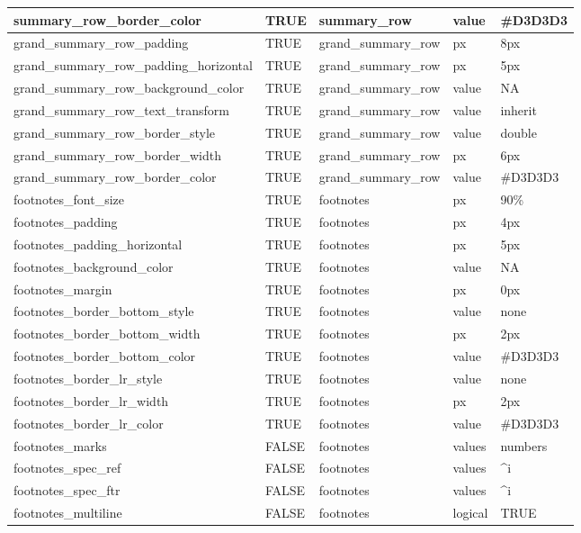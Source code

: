 \documentclass[
  letterpaper,
  DIV=11,
  numbers=noendperiod]{scrartcl}
\begin{document}
\begin{table}
{\begin{tabular}[t]{l|l|l|l|l}
\hline
summary\_row\_border\_color & TRUE & summary\_row & value & \#D3D3D3\\
\hline
grand\_summary\_row\_padding & TRUE & grand\_summary\_row & px & 8px\\
\hline
grand\_summary\_row\_padding\_horizontal & TRUE & grand\_summary\_row & px & 5px\\
\hline
grand\_summary\_row\_background\_color & TRUE & grand\_summary\_row & value & NA\\
\hline
grand\_summary\_row\_text\_transform & TRUE & grand\_summary\_row & value & inherit\\
\hline
grand\_summary\_row\_border\_style & TRUE & grand\_summary\_row & value & double\\
\hline
grand\_summary\_row\_border\_width & TRUE & grand\_summary\_row & px & 6px\\
\hline
grand\_summary\_row\_border\_color & TRUE & grand\_summary\_row & value & \#D3D3D3\\
\hline
footnotes\_font\_size & TRUE & footnotes & px & 90\%\\
\hline
footnotes\_padding & TRUE & footnotes & px & 4px\\
\hline
footnotes\_padding\_horizontal & TRUE & footnotes & px & 5px\\
\hline
footnotes\_background\_color & TRUE & footnotes & value & NA\\
\hline
footnotes\_margin & TRUE & footnotes & px & 0px\\
\hline
footnotes\_border\_bottom\_style & TRUE & footnotes & value & none\\
\hline
footnotes\_border\_bottom\_width & TRUE & footnotes & px & 2px\\
\hline
footnotes\_border\_bottom\_color & TRUE & footnotes & value & \#D3D3D3\\
\hline
footnotes\_border\_lr\_style & TRUE & footnotes & value & none\\
\hline
footnotes\_border\_lr\_width & TRUE & footnotes & px & 2px\\
\hline
footnotes\_border\_lr\_color & TRUE & footnotes & value & \#D3D3D3\\
\hline
footnotes\_marks & FALSE & footnotes & values & numbers\\
\hline
footnotes\_spec\_ref & FALSE & footnotes & values & \textasciicircum{}i\\
\hline
footnotes\_spec\_ftr & FALSE & footnotes & values & \textasciicircum{}i\\
\hline
footnotes\_multiline & FALSE & footnotes & logical & TRUE\\

\end{tabular}}
\end{table}
\end{document}
